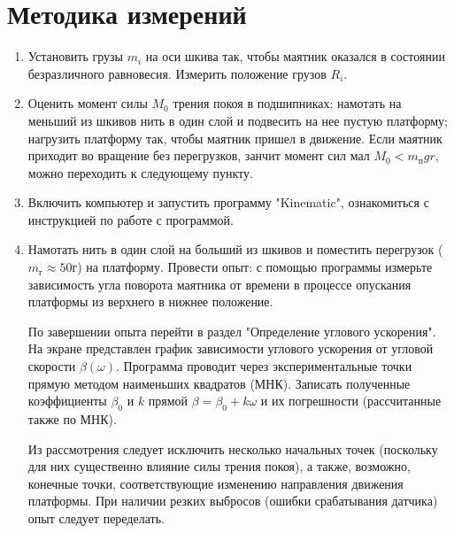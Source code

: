 \documentclass[a4paper]{article}
\begin{document}
\section{Методика измерений}
\begin{enumerate}
\item Установить грузы $m_i$ на оси шкива так, чтобы маятник оказался в состоянии безразличного равновесия. Измерить положение грузов $R_i$.
\item Оценить момент силы $M_0$ трения покоя в подшипниках: намотать на меньший из шкивов нить в один слой и подвесить на нее пустую платформу; нагрузить платформу так, чтобы маятник пришел в движение. Если маятник приходит во вращение без перегрузков, занчит момент сил мал $M_0<m_пgr$, можно переходить к следующему пункту.
\item Включить компьютер и запустить программу "Kinematic", ознакомиться с инструкцией по работе с программой.
\item Намотать нить в один слой на больший из шкивов и поместить перегрузок ($m_г\approx 50 г$) на платформу. Провести опыт: с помощью программы измерьте зависимость угла поворота маятника от времени в процессе опускания платформы из верхнего в нижнее положение.

По завершении опыта перейти в раздел "Определение углового ускорения". На экране представлен график зависимости углового ускорения от угловой скорости  $\beta(\omega)$. Программа проводит через экспериментальные точки прямую методом наименьших квадратов (МНК). Записать полученные коэффициенты $\beta_0$ и $k$ прямой $\beta=\beta_0+k\omega$ и их погрешности (рассчитанные также по МНК).

Из рассмотрения следует исключить несколько начальных точек (поскольку для них существенно влияние силы трения покоя), а также, возможно, конечные точки, соответствующие изменению направления движения платформы. При наличии резких выбросов (ошибки срабатывания датчика) опыт следует переделать. 


\end{enumerate}
\end{document}
